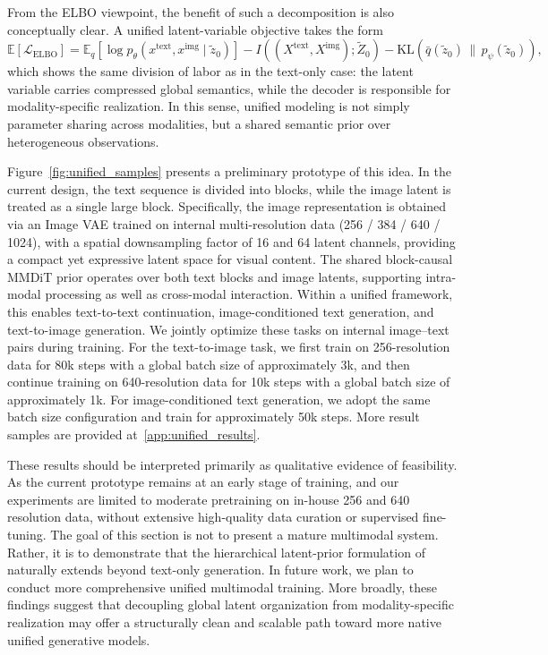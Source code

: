 From the ELBO viewpoint, the benefit of such a decomposition is also conceptually clear. A unified latent-variable objective takes the form
\[
\mathbb{E}[\mathcal{L}_{\mathrm{ELBO}}]
=
\mathbb{E}_{q}\!\left[\log p_{\theta}(x^{\text{text}}, x^{\text{img}} \mid \tilde z_0)\right]
- I\!\left((X^{\text{text}}, X^{\text{img}});\tilde Z_0\right)
- \mathrm{KL}\!\left(\bar q(\tilde z_0)\,\|\,p_{\psi}(\tilde z_0)\right),
\]
which shows the same division of labor as in the text-only case: the latent variable carries compressed global semantics, while the decoder is responsible for modality-specific realization. In this sense, unified modeling is not simply parameter sharing across modalities, but a shared semantic prior over heterogeneous observations.

Figure~\ref{fig:unified_samples} presents a preliminary prototype of this idea. In the current design, the text sequence is divided into blocks, while the image latent is treated as a single large block. Specifically, the image representation is obtained via an Image VAE trained on internal multi-resolution data (256 / 384 / 640 / 1024), with a spatial downsampling factor of 16 and 64 latent channels, providing a compact yet expressive latent space for visual content. The shared block-causal MMDiT prior operates over both text blocks and image latents, supporting intra-modal processing as well as cross-modal interaction. Within a unified framework, this enables text-to-text continuation, image-conditioned text generation, and text-to-image generation. We jointly optimize these tasks on internal image–text pairs during training. For the text-to-image task, we first train on 256-resolution data for 80k steps with a global batch size of approximately 3k, and then continue training on 640-resolution data for 10k steps with a global batch size of approximately 1k. For image-conditioned text generation, we adopt the same batch size configuration and train for approximately 50k steps. More result samples are provided at~\ref{app:unified_results}.

These results should be interpreted primarily as qualitative evidence of feasibility. As the current prototype remains at an early stage of training, and our experiments are limited to moderate pretraining on in-house 256 and 640 resolution data, without extensive high-quality data curation or supervised fine-tuning. The goal of this section is not to present a mature multimodal system. Rather, it is to demonstrate that the hierarchical latent-prior formulation of \method naturally extends beyond text-only generation. In future work, we plan to conduct more comprehensive unified multimodal training. More broadly, these findings suggest that decoupling global latent organization from modality-specific realization may offer a structurally clean and scalable path toward more native unified generative models.

